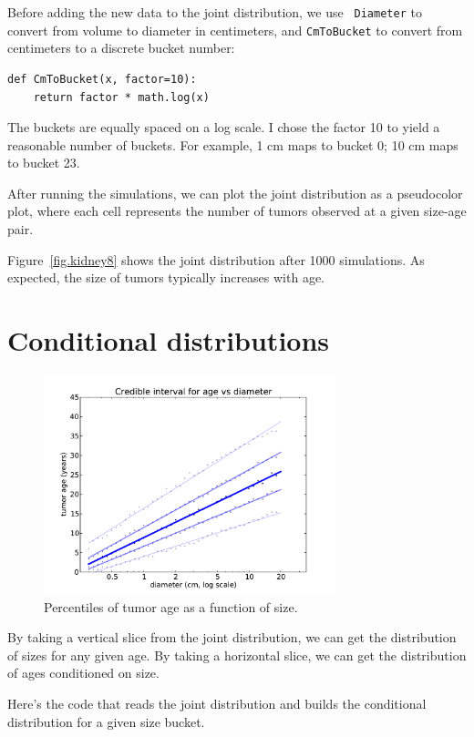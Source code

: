 \documentclass[12pt]{book}
\begin{document}
Before adding the new data to the joint distribution, we use {\tt
  Diameter} to convert from volume to diameter in centimeters, and
{\tt CmToBucket} to convert from centimeters to a discrete bucket
number:

\begin{verbatim}
def CmToBucket(x, factor=10):
    return factor * math.log(x)
\end{verbatim}

The buckets are equally spaced on a log scale.  I chose the
factor 10 to yield a reasonable number of buckets.  For example,
1 cm maps to bucket 0; 10 cm maps to bucket 23.

After running the simulations, we can plot the joint distribution
as a pseudocolor plot, where each cell represents the number of
tumors observed at a given size-age pair.

Figure~\ref{fig.kidney8} shows the joint distribution after 1000
simulations.  As expected, the size of tumors typically increases
with age.


\section{Conditional distributions}

\begin{figure}
\centerline{\includegraphics[height=2.5in]{figs/kidney7.pdf}}
\caption{Percentiles of tumor age as a function of size.}
\label{fig.kidney7}
\end{figure}

By taking a vertical slice from the joint distribution, we can get the
distribution of sizes for any given age.  By taking a horizontal
slice, we can get the distribution of ages conditioned on size.

Here's the code that reads the joint distribution and builds
the conditional distribution for a given size bucket.
\end{document}
